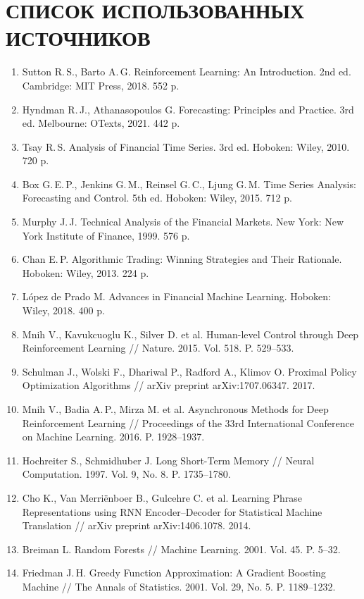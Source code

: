 \clearpage
\section*{СПИСОК ИСПОЛЬЗОВАННЫХ ИСТОЧНИКОВ}

\begin{enumerate}[leftmargin=1cm,label=\arabic*.]
\item Sutton R.\,S., Barto A.\,G. Reinforcement Learning: An Introduction. 2nd ed. Cambridge: MIT Press, 2018. 552 p.
\item Hyndman R.\,J., Athanasopoulos G. Forecasting: Principles and Practice. 3rd ed. Melbourne: OTexts, 2021. 442 p.
\item Tsay R.\,S. Analysis of Financial Time Series. 3rd ed. Hoboken: Wiley, 2010. 720 p.
\item Box G.\,E.\,P., Jenkins G.\,M., Reinsel G.\,C., Ljung G.\,M. Time Series Analysis: Forecasting and Control. 5th ed. Hoboken: Wiley, 2015. 712 p.
\item Murphy J.\,J. Technical Analysis of the Financial Markets. New York: New York Institute of Finance, 1999. 576 p.
\item Chan E.\,P. Algorithmic Trading: Winning Strategies and Their Rationale. Hoboken: Wiley, 2013. 224 p.
\item López de Prado M. Advances in Financial Machine Learning. Hoboken: Wiley, 2018. 400 p.
\item Mnih V., Kavukcuoglu K., Silver D. et al. Human-level Control through Deep Reinforcement Learning // Nature. 2015. Vol. 518. P. 529--533.
\item Schulman J., Wolski F., Dhariwal P., Radford A., Klimov O. Proximal Policy Optimization Algorithms // arXiv preprint arXiv:1707.06347. 2017.
\item Mnih V., Badia A.\,P., Mirza M. et al. Asynchronous Methods for Deep Reinforcement Learning // Proceedings of the 33rd International Conference on Machine Learning. 2016. P. 1928--1937.
\item Hochreiter S., Schmidhuber J. Long Short-Term Memory // Neural Computation. 1997. Vol. 9, No. 8. P. 1735--1780.
\item Cho K., Van Merriënboer B., Gulcehre C. et al. Learning Phrase Representations using RNN Encoder--Decoder for Statistical Machine Translation // arXiv preprint arXiv:1406.1078. 2014.
\item Breiman L. Random Forests // Machine Learning. 2001. Vol. 45. P. 5--32.
\item Friedman J.\,H. Greedy Function Approximation: A Gradient Boosting Machine // The Annals of Statistics. 2001. Vol. 29, No. 5. P. 1189--1232.

\end{enumerate}
